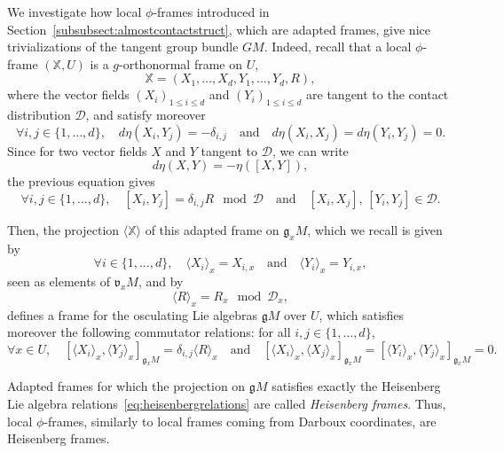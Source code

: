 \documentclass[12pt,a4paper]{amsart}
\theoremstyle{plain}
\theoremstyle{definition}
\theoremstyle{remark}
\numberwithin{equation}{section}
\theoremstyle{definition}
\def \cD{\mathcal{D}}
\def \bX{\mathbb{X}}
\def \fg{\mathfrak{g}}
\def \fv{\mathfrak{v}}
\numberwithin{equation}{section}
\begin{document}
We investigate how local $\phi$-frames introduced in Section~\ref{subsubsect:almostcontactstruct}, which are adapted frames, give nice trivializations of the tangent group bundle $GM$.
Indeed, recall that a local $\phi$-frame $(\bX,U)$ is a $g$-orthonormal frame on $U$, $$\bX = (X_1,\dots,X_d,Y_1,\dots,Y_d,R),$$  where the vector fields $(X_i)_{1\leq i\leq d}$ and $(Y_i)_{1\leq i\leq d}$ 
are tangent to the contact distribution $\cD$, and satisfy moreover 
\begin{equation*}
 \forall i,j \in \{1,\dots,d\},\quad d\eta(X_i,Y_j) = -\delta_{i,j}\quad\mbox{and}\quad d\eta(X_i,X_j) = d\eta(Y_i,Y_j) = 0.
\end{equation*}
Since for two vector fields $X$ and $Y$ tangent to $\cD$, we can write
\begin{equation*}
 d\eta(X,Y) = -\eta([X,Y]),
\end{equation*}
the previous equation gives 
\begin{equation*}
 \forall i,j \in \{1,\dots,d\},\quad [X_i,Y_j] = \delta_{i,j} R \mod \cD\quad\mbox{and}\quad [X_i,X_j],\, [Y_i,Y_j]\in\cD.
\end{equation*}

Then, the projection $\langle \bX\rangle$ of this adapted frame on $\fg_x M$, which we recall is given by 
\begin{equation*}
 \forall i \in \{1,\dots,d\},\quad \langle X_i \rangle_x = X_{i,x}\quad\mbox{and}\quad\langle Y_i \rangle_x = Y_{i,x},
\end{equation*}
seen as elements of $\fv_x M$, and by 
\begin{equation*}
 \langle R\rangle_x = R_x \mod \cD_x,
\end{equation*}
defines a frame for the osculating Lie algebras $\fg M$ over $U$, which satisfies moreover the following commutator relations: for all $i,j\in\{1,\dots,d\}$,
\begin{equation*}
 \forall x \in U,\quad [\langle X_i\rangle_x,\langle Y_j\rangle_x]_{\fg_x M} = \delta_{i,j} \langle R\rangle_x\quad\mbox{and}\quad [\langle X_i\rangle_x,\langle X_j\rangle_x]_{\fg_x M}= [\langle Y_i\rangle_x,\langle Y_j\rangle_x]_{\fg_x M}=0.
\end{equation*}

Adapted frames for which the projection on $\mathfrak{g}M$ satisfies exactly the Heisenberg Lie algebra relations~\eqref{eq:heisenbergrelations} are called \emph{Heisenberg frames}. Thus, local $\phi$-frames, similarly to local frames coming from Darboux coordinates, are Heisenberg frames.
\end{document}
